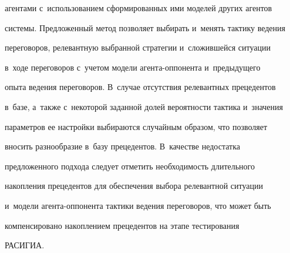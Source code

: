 агентами с~использованием сформированных ими моделей других агентов 


системы. Предложенный метод позволяет выбирать и~менять тактику ведения 


переговоров, релевантную выбранной стратегии и~сложившейся ситуации 


в~ходе переговоров с~учетом модели аген\-та-оп\-по\-нен\-та и~предыдущего 


опыта ведения переговоров. В~случае отсутствия релевантных прецедентов 


в~базе, а~также с~некоторой заданной долей вероятности тактика и~значения 


параметров ее настройки выбираются случайным образом, что позволяет 


вносить разнообразие в~базу прецедентов. В~качестве недостатка 


предложенного подхода следует отметить необходимость длительного 


накопления прецедентов для обеспечения выбора релевантной ситуации 


и~модели аген\-та-оп\-по\-нен\-та тактики ведения переговоров, что может быть 


компенсировано накоплением прецедентов на этапе тестирования 


\mbox{РАСИГИА.}


  



